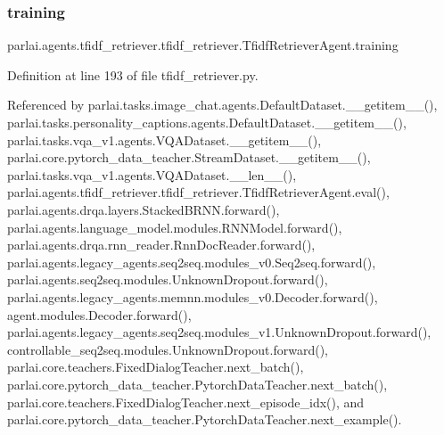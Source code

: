\subsubsection{\texorpdfstring{training}{training}}
{\footnotesize\ttfamily parlai.\+agents.\+tfidf\+\_\+retriever.\+tfidf\+\_\+retriever.\+Tfidf\+Retriever\+Agent.\+training}



Definition at line 193 of file tfidf\+\_\+retriever.\+py.



Referenced by parlai.\+tasks.\+image\+\_\+chat.\+agents.\+Default\+Dataset.\+\_\+\+\_\+getitem\+\_\+\+\_\+(), parlai.\+tasks.\+personality\+\_\+captions.\+agents.\+Default\+Dataset.\+\_\+\+\_\+getitem\+\_\+\+\_\+(), parlai.\+tasks.\+vqa\+\_\+v1.\+agents.\+V\+Q\+A\+Dataset.\+\_\+\+\_\+getitem\+\_\+\+\_\+(), parlai.\+core.\+pytorch\+\_\+data\+\_\+teacher.\+Stream\+Dataset.\+\_\+\+\_\+getitem\+\_\+\+\_\+(), parlai.\+tasks.\+vqa\+\_\+v1.\+agents.\+V\+Q\+A\+Dataset.\+\_\+\+\_\+len\+\_\+\+\_\+(), parlai.\+agents.\+tfidf\+\_\+retriever.\+tfidf\+\_\+retriever.\+Tfidf\+Retriever\+Agent.\+eval(), parlai.\+agents.\+drqa.\+layers.\+Stacked\+B\+R\+N\+N.\+forward(), parlai.\+agents.\+language\+\_\+model.\+modules.\+R\+N\+N\+Model.\+forward(), parlai.\+agents.\+drqa.\+rnn\+\_\+reader.\+Rnn\+Doc\+Reader.\+forward(), parlai.\+agents.\+legacy\+\_\+agents.\+seq2seq.\+modules\+\_\+v0.\+Seq2seq.\+forward(), parlai.\+agents.\+seq2seq.\+modules.\+Unknown\+Dropout.\+forward(), parlai.\+agents.\+legacy\+\_\+agents.\+memnn.\+modules\+\_\+v0.\+Decoder.\+forward(), agent.\+modules.\+Decoder.\+forward(), parlai.\+agents.\+legacy\+\_\+agents.\+seq2seq.\+modules\+\_\+v1.\+Unknown\+Dropout.\+forward(), controllable\+\_\+seq2seq.\+modules.\+Unknown\+Dropout.\+forward(), parlai.\+core.\+teachers.\+Fixed\+Dialog\+Teacher.\+next\+\_\+batch(), parlai.\+core.\+pytorch\+\_\+data\+\_\+teacher.\+Pytorch\+Data\+Teacher.\+next\+\_\+batch(), parlai.\+core.\+teachers.\+Fixed\+Dialog\+Teacher.\+next\+\_\+episode\+\_\+idx(), and parlai.\+core.\+pytorch\+\_\+data\+\_\+teacher.\+Pytorch\+Data\+Teacher.\+next\+\_\+example().

\mbox{\label{classparlai_1_1agents_1_1tfidf__retriever_1_1tfidf__retriever_1_1TfidfRetrieverAgent_a7f513dbbd924cff1eb534294e59cec75}} 
